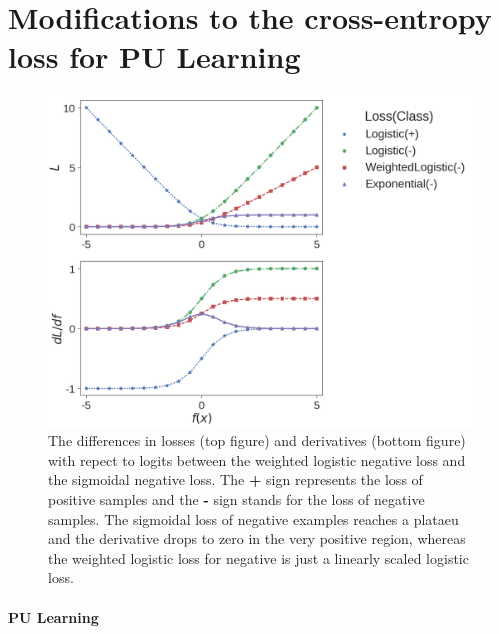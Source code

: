\section{Modifications to the cross-entropy loss for PU Learning}
\label{sec:pulearning}



\begin{figure}[t]
\centering
   \includegraphics[width=1.05\linewidth]{img/losses}
\caption{
The differences in losses (top figure) and derivatives (bottom figure) with repect to logits between the weighted logistic negative loss and the sigmoidal negative loss.
The \textbf{+} sign represents the loss of positive samples and the \textbf{-} sign stands for the loss of negative samples.
The sigmoidal loss of negative examples reaches a plataeu and the derivative drops to zero in the very positive region, whereas the weighted logistic loss for negative is just a linearly scaled logistic loss.
}
\label{fig:losses}
\end{figure}


\paragraph{PU Learning}

